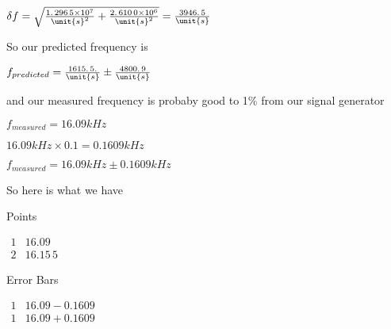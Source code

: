 \documentclass{sebase}
\begin{document}
\bigskip $\delta f=\sqrt{\allowbreak \allowbreak \allowbreak \allowbreak
\allowbreak \frac{1.\,\allowbreak 296\,5\times 10^{7}}{\unit{s}^{2}}%
+\allowbreak \frac{2.\,\allowbreak 610\,0\times 10^{6}}{\unit{s}^{2}}}%
=\allowbreak \frac{3946.\,\allowbreak 5}{\unit{s}}$

So our predicted frequency is 

$f_{predicted}=\frac{1615.\,\allowbreak 5.}{\unit{s}}\pm \allowbreak \frac{%
4800.\,\allowbreak 9}{\unit{s}}$

and our measured frequency is probaby good to 1\% from our signal generator

$f_{measured}=16.09\unit{kHz}$

$16.09\unit{kHz}\times 0.1=\allowbreak 0.1\allowbreak 609\unit{kHz}$

\bigskip $f_{measured}=16.09\unit{kHz}\pm 0.\allowbreak 1\allowbreak 609%
\unit{kHz}$

So here is what we have

Points

$%
\begin{array}{cc}
1 & 16.09 \\ 
2 & 16.15\,\allowbreak 5%
\end{array}%
$

Error Bars

$%
\begin{array}{cc}
1 & 16.09-0.\allowbreak 1\allowbreak 609 \\ 
1 & 16.09+0.\allowbreak 1\allowbreak 609%
\end{array}%
$
\end{document}
